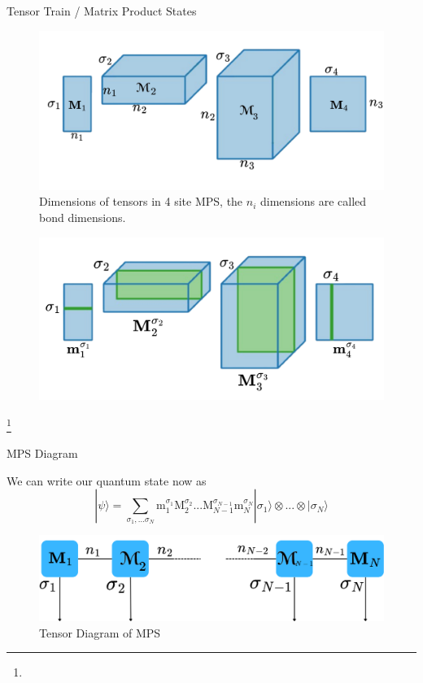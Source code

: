 \documentclass{beamer}
\newcommand{\euler}[1]{\boldsymbol{\EuScript{#1}}}
\newcommand{\romanL}[1]{\boldsymbol{\mathrm{#1}}}
\newcommand\blfootnote[1]{%
  \begingroup
  \renewcommand\thefootnote{}\footnote{#1}%
  \addtocounter{footnote}{-1}%
  \endgroup
}
\begin{document}
\begin{frame}{Tensor Train / Matrix Product States}
    \scriptsize
    
    \begin{figure}
        \centering
        \includegraphics[width = 0.55\linewidth]{images/Misc/MPS_Closer2.png}
        \caption{\scriptsize Dimensions of tensors in 4 site MPS, the $n_i$ dimensions are called bond dimensions.}
        \label{fig:MPS_closer}
    \end{figure}
    \pause
    \begin{figure}
        \centering
        \includegraphics[width=0.55\linewidth]{images/Misc/MPS_element_2.png}
        \label{fig:MPS_Element}
    \end{figure}
    \blfootnote{}
\end{frame}

\begin{frame}{MPS Diagram}
    
    We can write our quantum state now as 
    \begin{equation}
        |\psi\rangle = \sum_{\sigma_1,...\sigma_N}\romanL{m}_1^{\sigma_1}\romanL{M}_2^{\sigma_2}...\romanL{M}_{N - 1}^{\sigma_{N - 1}}\romanL{m}_N^{\sigma_N}|\sigma_1\rangle \otimes...\otimes|\sigma_N\rangle
    \end{equation}

    \begin{figure}
        \centering
        \includegraphics[width=0.9\linewidth]{images/General Tensor Diagrams/MPS_diagram.png}
        \caption{Tensor Diagram of MPS}
        \label{fig:MPS_diagram}
    \end{figure}
\end{frame}
\end{document}
